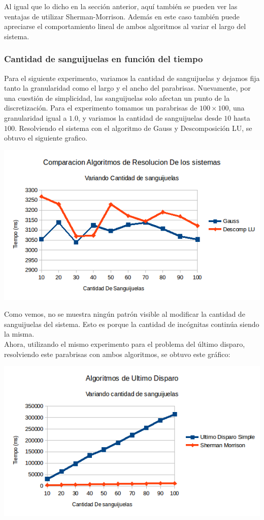 Al igual que lo dicho en la sección anterior, aquí también se pueden ver las ventajas de utilizar Sherman-Morrison. Además en este caso también puede apreciarse el comportamiento lineal de ambos algoritmos al variar el largo del sistema.

\subsubsection{Cantidad de sanguijuelas en función del tiempo}
Para el siguiente experimento, variamos la cantidad de sanguijuelas y dejamos fija tanto la granularidad como el largo y el ancho del parabrisas. Nuevamente, por una cuestión de simplicidad, las sanguijuelas solo afectan un punto de la discretización. Para el experimento tomamos un parabrisas de $100 \times 100$, una granularidad igual a $1.0$, y variamos la cantidad de sanguijuelas desde $10$ hasta $100$. Resolviendo el sistema con el algoritmo de Gauss y Descomposición LU, se obtuvo el siguiente grafico.

\begin{center}
 \includegraphics[width=400pt]{imagenes/testeo/sangGauss.png}
\end{center}

Como vemos, no se muestra ningún patrón visible al modificar la cantidad de sanguijuelas del sistema. Esto es porque la cantidad de incógnitas continúa siendo la misma.
\\
Ahora, utilizando el mismo experimento para el problema del último disparo, resolviendo este parabrisas con ambos algoritmos, se obtuvo este gráfico:

\begin{center}
 \includegraphics[width=400pt]{imagenes/testeo/sangSalv.png}
\end{center}

